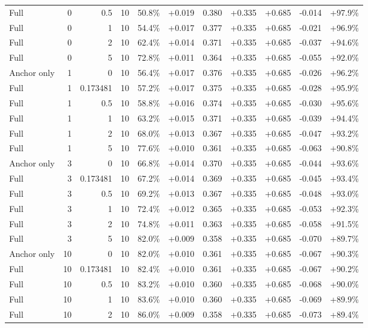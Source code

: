 \begin{table}[htbp]
\begin{tabular}{lrrrccccccc}
Full & 0 & 0.5 & 10 & 50.8\% & +0.019 & 0.380 & +0.335 & +0.685 & -0.014 & +97.9\% \\
Full & 0 & 1 & 10 & 54.4\% & +0.017 & 0.377 & +0.335 & +0.685 & -0.021 & +96.9\% \\
Full & 0 & 2 & 10 & 62.4\% & +0.014 & 0.371 & +0.335 & +0.685 & -0.037 & +94.6\% \\
Full & 0 & 5 & 10 & 72.8\% & +0.011 & 0.364 & +0.335 & +0.685 & -0.055 & +92.0\% \\
Anchor only & 1 & 0 & 10 & 56.4\% & +0.017 & 0.376 & +0.335 & +0.685 & -0.026 & +96.2\% \\
Full & 1 & 0.173481 & 10 & 57.2\% & +0.017 & 0.375 & +0.335 & +0.685 & -0.028 & +95.9\% \\
Full & 1 & 0.5 & 10 & 58.8\% & +0.016 & 0.374 & +0.335 & +0.685 & -0.030 & +95.6\% \\
Full & 1 & 1 & 10 & 63.2\% & +0.015 & 0.371 & +0.335 & +0.685 & -0.039 & +94.4\% \\
Full & 1 & 2 & 10 & 68.0\% & +0.013 & 0.367 & +0.335 & +0.685 & -0.047 & +93.2\% \\
Full & 1 & 5 & 10 & 77.6\% & +0.010 & 0.361 & +0.335 & +0.685 & -0.063 & +90.8\% \\
Anchor only & 3 & 0 & 10 & 66.8\% & +0.014 & 0.370 & +0.335 & +0.685 & -0.044 & +93.6\% \\
Full & 3 & 0.173481 & 10 & 67.2\% & +0.014 & 0.369 & +0.335 & +0.685 & -0.045 & +93.4\% \\
Full & 3 & 0.5 & 10 & 69.2\% & +0.013 & 0.367 & +0.335 & +0.685 & -0.048 & +93.0\% \\
Full & 3 & 1 & 10 & 72.4\% & +0.012 & 0.365 & +0.335 & +0.685 & -0.053 & +92.3\% \\
Full & 3 & 2 & 10 & 74.8\% & +0.011 & 0.363 & +0.335 & +0.685 & -0.058 & +91.5\% \\
Full & 3 & 5 & 10 & 82.0\% & +0.009 & 0.358 & +0.335 & +0.685 & -0.070 & +89.7\% \\
Anchor only & 10 & 0 & 10 & 82.0\% & +0.010 & 0.361 & +0.335 & +0.685 & -0.067 & +90.3\% \\
Full & 10 & 0.173481 & 10 & 82.4\% & +0.010 & 0.361 & +0.335 & +0.685 & -0.067 & +90.2\% \\
Full & 10 & 0.5 & 10 & 83.2\% & +0.010 & 0.360 & +0.335 & +0.685 & -0.068 & +90.0\% \\
Full & 10 & 1 & 10 & 83.6\% & +0.010 & 0.360 & +0.335 & +0.685 & -0.069 & +89.9\% \\
Full & 10 & 2 & 10 & 86.0\% & +0.009 & 0.358 & +0.335 & +0.685 & -0.073 & +89.4\% \\

\end{tabular}
\end{table}
